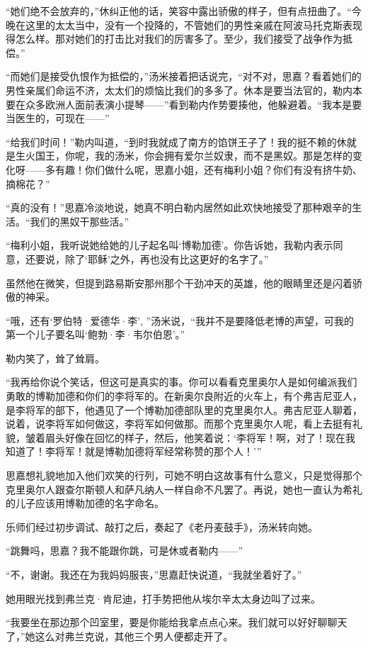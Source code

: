 \par “她们绝不会放弃的，”休纠正他的话，笑容中露出骄傲的样子，但有点扭曲了。“今晚在这里的太太当中，没有一个投降的，不管她们的男性亲戚在阿波马托克斯表现得怎么样。那对她们的打击比对我们的厉害多了。至少，我们接受了战争作为抵偿。”
\par “而她们是接受仇恨作为抵偿的，”汤米接着把话说完，“对不对，思嘉？看着她们的男性亲属们命运不济，太太们的烦恼比我们的多多了。休本是要当法官的，勒内本要在众多欧洲人面前表演小提琴——”看到勒内作势要揍他，他躲避着。“我本是要当医生的，可现在——”
\par “给我们时间！”勒内叫道，“到时我就成了南方的馅饼王子了！我的挺不赖的休就是生火国王，你呢，我的汤米，你会拥有爱尔兰奴隶，而不是黑奴。那是怎样的变化呀——多有趣！你们做什么呢，思嘉小姐，还有梅利小姐？你们有没有挤牛奶、摘棉花？”
\par “真的没有！”思嘉冷淡地说，她真不明白勒内居然如此欢快地接受了那种艰辛的生活。“我们的黑奴干那些活。”
\par “梅利小姐，我听说她给她的儿子起名叫‘博勒加德’。你告诉她，我勒内表示同意，还要说，除了‘耶稣’之外，再也没有比这更好的名字了。”
\par 虽然他在微笑，但提到路易斯安那州那个干劲冲天的英雄，他的眼睛里还是闪着骄傲的神采。
\par “哦，还有‘罗伯特·爱德华·李’, ”汤米说，“我并不是要降低老博的声望，可我的第一个儿子要名叫‘鲍勃·李·韦尔伯恩’。”
\par 勒内笑了，耸了耸肩。
\par “我再给你说个笑话，但这可是真实的事。你可以看看克里奥尔人是如何编派我们勇敢的博勒加德和你们的李将军的。在新奥尔良附近的火车上，有个弗吉尼亚人，是李将军的部下，他遇见了一个博勒加德部队里的克里奥尔人。弗吉尼亚人聊着，说着，说李将军如何做这，李将军如何做那。而那个克里奥尔人呢，看上去挺有礼貌，皱着眉头好像在回忆的样子，然后，他笑着说：‘李将军！啊，对了！现在我知道了！李将军！就是博勒加德将军经常称赞的那个人！'”
\par 思嘉想礼貌地加入他们欢笑的行列，可她不明白这故事有什么意义，只是觉得那个克里奥尔人跟查尔斯顿人和萨凡纳人一样自命不凡罢了。再说，她也一直认为希礼的儿子应该用博勒加德的名字命名。
\par 乐师们经过初步调试、敲打之后，奏起了《老丹麦鼓手》，汤米转向她。
\par “跳舞吗，思嘉？我不能跟你跳，可是休或者勒内——”
\par “不，谢谢。我还在为我妈妈服丧，”思嘉赶快说道，“我就坐着好了。”
\par 她用眼光找到弗兰克·肯尼迪，打手势把他从埃尔辛太太身边叫了过来。
\par “我要坐在那边那个凹室里，要是你能给我拿点点心来。我们就可以好好聊聊天了，”她这么对弗兰克说，其他三个男人便都走开了。
